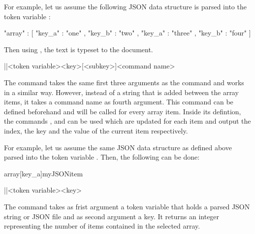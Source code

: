 \documentclass[a4paper]{article}
\begin{document}
{{For example, let us assume the following JSON data structure is parsed into the token variable \macro{\myJSONdata}:

\begin{codeexample}
{
  "array" : [
    {
      "key_a" : "one" ,
      "key_b" : "two"
    } ,
    {
      "key_a" : "three" ,
      "key_b" : "four"
    }
  ]
}
\end{codeexample}

Then using , the text  is typeset to the document. 

\begin{macrodef}
|\JSONParseUseArrayValues|{<token variable>}{<key>}[<subkey>]{<command name>}
\end{macrodef}
The command \macro{\JSONParseUseArrayValues} takes the same first three arguments as the command \macro{\JSONParseGetArrayValues} and works in a similar way. However, instead of a string that is added between the array items, it takes a command name as fourth argument. This command can be defined beforehand and will be called for every array item. Inside its defintion, the commands \macro{\JSONParseArrayIndex}, \macro{\JSONParseArrayKey} and \macro{\JSONParseArrayValue} can be used which are updated for each item and output the index, the key and the value of the current item respectively. 

For example, let us assume the same JSON data structure as defined above parsed into the token variable \macro{\myJSONdata}. Then, the following can be done:


\begin{codeexamplecolumns}
\newcommand{\myJSONitem}{
  \item \emph{\JSONParseArrayValue}
}

\begin{itemize}
  \JSONParseUseArrayValues{\myJSONdata}
    {array}[key_a]{myJSONitem}
\end{itemize}
\end{codeexamplecolumns}

\begin{macrodef}
|\JSONParseGetArrayCount|{<token variable>}{<key>}
\end{macrodef}
The command \macro{\JSONParseGetArrayCount} takes as frist argument a token variable that holds a parsed JSON string or JSON file and as second argument a key. It returns an integer representing the number of items contained in the selected array.

}}
\end{document}
